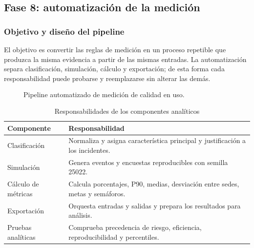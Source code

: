 

\subsection{Fase 8: automatización de la medición}


\subsubsection{Objetivo y diseño del pipeline}

El objetivo es convertir las reglas de medición en un proceso repetible que produzca la misma evidencia a partir de las mismas entradas. La automatización separa clasificación, simulación, cálculo y exportación; de esta forma cada responsabilidad puede probarse y reemplazarse sin alterar las demás.

\begin{figure}[H]
\centering
{}
\caption{Pipeline automatizado de medición de calidad en uso.}
\label{fig:pipeline-phase8}
\end{figure}

\begin{table}[H]
\centering
\caption{Responsabilidades de los componentes analíticos}
\label{tab:pipeline-components}
\begin{tabularx}{\textwidth}{p{4.3cm}Y}
\toprule
Componente & Responsabilidad \\
\midrule
Clasificación & Normaliza y asigna característica principal y justificación a los incidentes. \\
Simulación & Genera eventos y encuestas reproducibles con semilla 25022. \\
Cálculo de métricas & Calcula porcentajes, P90, medias, desviación entre sedes, metas y semáforos. \\
Exportación & Orquesta entradas y salidas y prepara los resultados para análisis. \\
Pruebas analíticas & Comprueba precedencia de riesgo, eficiencia, reproducibilidad y percentiles. \\
\bottomrule
\end{tabularx}
\end{table}

